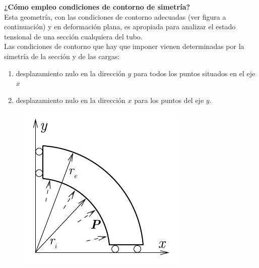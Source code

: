 \documentclass[a4paper,12pt]{article}
\begin{document}
\textbf{¿Cómo empleo condiciones de contorno de simetría?}\\

Esta geometría, con las condiciones de contorno adecuadas (ver figura a continuación) y en deformación plana, es apropiada para analizar el estado tensional de una sección cualquiera del tubo.\\

Las condiciones de contorno que hay que imponer vienen determinadas por la simetría de la sección y de las cargas:
\begin{enumerate}
\item desplazamiento nulo en la dirección $y$ para todos los puntos situados en el eje $x$
\item desplazamiento nulo en la dirección $x$ para los puntos del eje $y$.
\end{enumerate}


\begin{figure}
\centering
\includegraphics{cilipst}
\end{figure}
\end{document}
